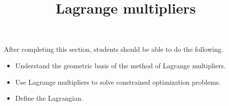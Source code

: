 \documentclass{ximera}
\title{Lagrange multipliers}
\begin{document}
\begin{abstract}
\end{abstract}
\maketitle

\begin{sectionOutcomes}

After completing this section, students should be able to do the following.

\begin{itemize}
\item Understand the geometric basis of the method of Lagrange
  multipliers.
\item Use Lagrange multipliers to solve constrained optimization
  problems.
\item Define the Lagrangian.
\end{itemize}

\end{sectionOutcomes}
\end{document}
